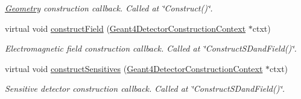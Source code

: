 \begin{DoxyCompactItemize}
\begin{DoxyCompactList}\small\item\em \hyperlink{namespace_d_d4hep_1_1_geometry}{Geometry} construction callback. Called at \char`\"{}\+Construct()\char`\"{}. \end{DoxyCompactList}\item 
virtual void \hyperlink{class_d_d4hep_1_1_simulation_1_1_geant4_detector_construction_sequence_a74d488648a50cae0230ca9dedf678160}{construct\+Field} (\hyperlink{class_d_d4hep_1_1_simulation_1_1_geant4_detector_construction_context}{Geant4\+Detector\+Construction\+Context} $\ast$ctxt)
\begin{DoxyCompactList}\small\item\em Electromagnetic field construction callback. Called at \char`\"{}\+Construct\+S\+Dand\+Field()\char`\"{}. \end{DoxyCompactList}\item 
virtual void \hyperlink{class_d_d4hep_1_1_simulation_1_1_geant4_detector_construction_sequence_ab242c91f95283ed32133f48f2bc573fa}{construct\+Sensitives} (\hyperlink{class_d_d4hep_1_1_simulation_1_1_geant4_detector_construction_context}{Geant4\+Detector\+Construction\+Context} $\ast$ctxt)
\begin{DoxyCompactList}\small\item\em Sensitive detector construction callback. Called at \char`\"{}\+Construct\+S\+Dand\+Field()\char`\"{}. \end{DoxyCompactList}\end{DoxyCompactItemize}
{\bf }\par
